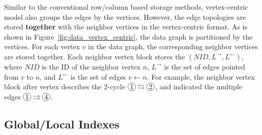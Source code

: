 Similar to the conventional row/column based storage methods,
vertex-centric model also groups the edges by the vertices.
However, the edge topologies are stored \textbf{together} with the neighbor vertices in the vertex-centric format.
As is shown in Figure~\ref{fig:data_vertex_centric},
the data graph is partitioned by the vertices.
For each vertex $v$ in the data graph, the corresponding neighbor vertices are stored together.
Each neighbor vertex block stores the $(NID, L^{\rightarrow}, L^{\leftarrow})$, where $NID$ is the ID of the neighbor vertex $n$,
$L^{\rightarrow}$ is the set of edges pointed from $v$ to $n$, and $L^{\leftarrow}$ is the set of edges $v \leftarrow n$.
For example, the neighbor vertex block  after vertex  describes the 2-cycle $\circled{1} \leftrightarrows \circled{2}$, and  indicated the multiple edges $\circled{1} \rightrightarrows \circled{4}$.

\subsection{Global/Local Indexes}
